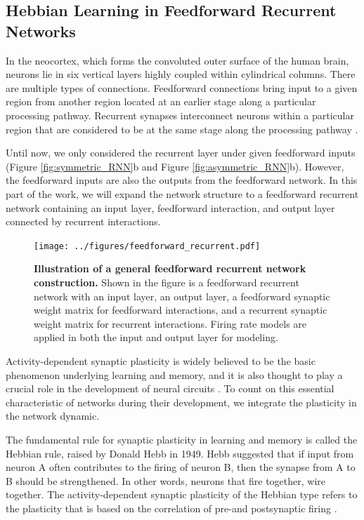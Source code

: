 \documentclass[11pt]{article}
\begin{document}
{	\subsection{Hebbian Learning in Feedforward Recurrent Networks} \label{sec:Hebb_learn}
	In the neocortex, which forms the convoluted outer surface of the human brain, neurons lie in six vertical layers highly coupled within cylindrical columns. There are multiple types of connections. Feedforward connections bring input to a given region from another region located at an earlier stage along a particular processing pathway. Recurrent synapses interconnect neurons within a particular region that are considered to be at the same stage along the processing pathway \cite{dayan2005theoretical}. 
	
	Until now, we only considered the recurrent layer under given feedforward inputs (Figure \ref{fig:symmetric_RNN}b and Figure \ref{fig:asymmetric_RNN}b). However, the feedforward inputs are also the outputs from the feedforward network. In this part of the work, we will expand the network structure to a feedforward recurrent network containing an input layer, feedforward interaction, and output layer connected by recurrent interactions.
	
		\begin{figure}[H]
			\centering
			\texttt{[image: ../figures/feedforward\_recurrent.pdf]}
			\caption{\textbf{Illustration of a general feedforward recurrent network construction.} Shown in the figure is a feedforward recurrent network with an input layer, an output layer, a feedforward synaptic weight matrix for feedforward interactions, and a recurrent synaptic weight matrix for recurrent interactions. Firing rate models are applied in both the input and output layer for modeling.}
			\label{fig:feedforward_recurrent_network}
		\end{figure} 
	
	Activity-dependent synaptic plasticity is widely believed to be the basic phenomenon underlying learning and memory, and it is also thought to play a crucial role in the development of neural circuits \cite{dayan2005theoretical}. To count on this essential characteristic of networks during their development, we integrate the plasticity in the network dynamic. 
	
	The fundamental rule for synaptic plasticity in learning and memory is called the Hebbian rule, raised by Donald Hebb in 1949. Hebb suggested that if input from neuron A often contributes to the firing of neuron B, then the synapse from A to B should be strengthened. In other words, neurons that fire together, wire together. The activity-dependent synaptic plasticity of the Hebbian type refers to the plasticity that is based on the correlation of pre-and postsynaptic firing \cite{dayan2005theoretical}. 
	
}
\end{document}
